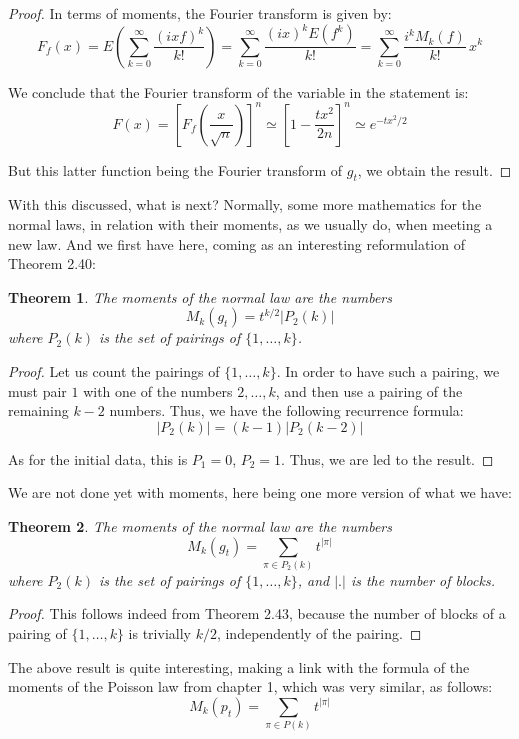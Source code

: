 \documentclass[12pt]{amsbook}
\newtheorem{theorem}{Theorem}[chapter]
\begin{document}
\begin{proof}
In terms of moments, the Fourier transform is given by:
$$F_f(x)
=E\left(\sum_{k=0}^\infty\frac{(ixf)^k}{k!}\right)
=\sum_{k=0}^\infty\frac{(ix)^kE(f^k)}{k!}
=\sum_{k=0}^\infty\frac{i^kM_k(f)}{k!}\,x^k$$

We conclude that the Fourier transform of the variable in the statement is:
$$F(x)
=\left[F_f\left(\frac{x}{\sqrt{n}}\right)\right]^n
\simeq\left[1-\frac{tx^2}{2n}\right]^n
\simeq e^{-tx^2/2}$$

But this latter function being the Fourier transform of $g_t$, we obtain the result.
\end{proof}

With this discussed, what is next? Normally, some more mathematics for the normal laws, in relation with their moments, as we usually do, when meeting a new law. And we first have here, coming as an interesting reformulation of Theorem 2.40:

\begin{theorem}
The moments of the normal law are the numbers
$$M_k(g_t)=t^{k/2}|P_2(k)|$$
where $P_2(k)$ is the set of pairings of $\{1,\ldots,k\}$.
\end{theorem}

\begin{proof}
Let us count the pairings of $\{1,\ldots,k\}$. In order to have such a pairing, we must pair $1$ with one of the numbers $2,\ldots,k$, and then use a pairing of the remaining $k-2$ numbers. Thus, we have the following recurrence formula:
$$|P_2(k)|=(k-1)|P_2(k-2)|$$

As for the initial data, this is $P_1=0$, $P_2=1$. Thus, we are led to the result.
\end{proof}

We are not done yet with moments, here being one more version of what we have:

\begin{theorem}
The moments of the normal law are the numbers
$$M_k(g_t)=\sum_{\pi\in P_2(k)}t^{|\pi|}$$
where $P_2(k)$ is the set of pairings of $\{1,\ldots,k\}$, and $|.|$ is the number of blocks.
\end{theorem}

\begin{proof}
This follows indeed from Theorem 2.43, because the number of blocks of a pairing of $\{1,\ldots,k\}$ is trivially $k/2$, independently of the pairing.
\end{proof}

The above result is quite interesting, making a link with the formula of the moments of the Poisson law from chapter 1, which was very similar, as follows:
$$M_k(p_t)=\sum_{\pi\in P(k)}t^{|\pi|}$$
\end{document}
